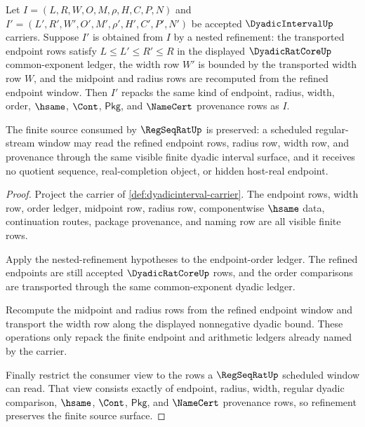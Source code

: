 \begin{theorem}
\label{thm:dyadicinterval-nested-refinement-ledger}
Let $I=(L,R,W,O,M,\rho,H,C,P,N)$ and
$I'=(L',R',W',O',M',\rho',H',C',P',N')$ be accepted
$\DyadicIntervalUp$ carriers. Suppose $I'$ is obtained from $I$ by a nested
refinement: the transported endpoint rows satisfy $L\leq L'\leq R'\leq R$ in
the displayed $\DyadicRatCoreUp$ common-exponent ledger, the width row $W'$
is bounded by the transported width row $W$, and the midpoint and radius rows
are recomputed from the refined endpoint window. Then $I'$ repacks the same
kind of endpoint, radius, width, order, $\hsame$, $\Cont$, $\mathsf{Pkg}$, and
$\NameCert$ provenance rows as $I$.

The finite source consumed by $\RegSeqRatUp$ is preserved: a scheduled
regular-stream window may read the refined endpoint rows, radius row, width
row, and provenance through the same visible finite dyadic interval surface,
and it receives no quotient sequence, real-completion object, or hidden
host-real endpoint.
\end{theorem}
\begin{proof}
Project the carrier of \autoref{def:dyadicinterval-carrier}. The endpoint
rows, width row, order ledger, midpoint row, radius row, componentwise
$\hsame$ data, continuation routes, package provenance, and naming row are
all visible finite rows.

Apply the nested-refinement hypotheses to the endpoint-order ledger. The
refined endpoints are still accepted $\DyadicRatCoreUp$ rows, and the order
comparisons are transported through the same common-exponent dyadic ledger.

Recompute the midpoint and radius rows from the refined endpoint window and
transport the width row along the displayed nonnegative dyadic bound. These
operations only repack the finite endpoint and arithmetic ledgers already
named by the carrier.

Finally restrict the consumer view to the rows a $\RegSeqRatUp$ scheduled
window can read. That view consists exactly of endpoint, radius, width,
regular dyadic comparison, $\hsame$, $\Cont$, $\mathsf{Pkg}$, and $\NameCert$
provenance rows, so refinement preserves the finite source surface.
\end{proof}

